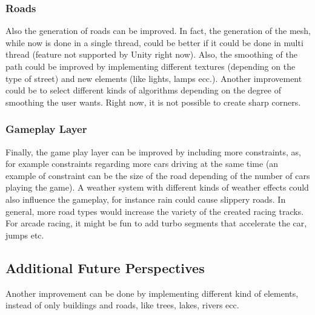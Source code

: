 \documentclass[conference]{IEEEtran}
\begin{document}
\subsubsection{Roads}

Also the generation of roads can be improved. In fact, the generation of the mesh, while now is done in a single thread, could be better if it could be done in multi thread (feature not supported by Unity right now). Also, the smoothing of the path could be improved by implementing different textures (depending on the type of street) and new elements (like lights, lamps ecc.). Another improvement could be to select different kinds of algorithms depending on the degree of smoothing the user wants. Right now, it is not possible to create sharp corners.

\subsubsection{Gameplay Layer}

Finally, the game play layer can be improved by including more constraints, as, for example constraints regarding more cars driving at the same time (an example of constraint can be the size of the road depending of the number of cars playing the game). A weather system with different kinds of weather effects could also influence the gameplay, for instance rain could cause slippery roads. In general, more road types would increase the variety of the created racing tracks. For arcade racing, it might be fun to add turbo segments that accelerate the car, jumps etc.

\subsection{Additional Future Perspectives}
Another improvement can be done by implementing different kind of elements, instead of only buildings and roads, like trees, lakes, rivers ecc.
\end{document}
